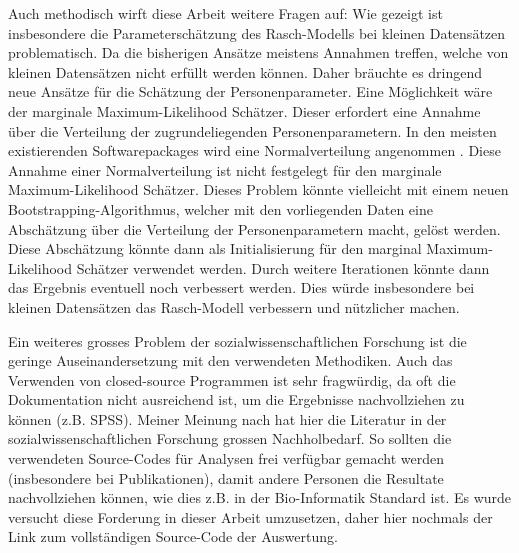 Auch methodisch wirft diese Arbeit weitere Fragen auf: Wie gezeigt ist insbesondere die Parameterschätzung des Rasch-Modells bei kleinen Datensätzen problematisch. Da die bisherigen Ansätze meistens Annahmen treffen, welche von kleinen Datensätzen nicht erfüllt werden können. Daher bräuchte es dringend neue Ansätze für die Schätzung der Personenparameter. Eine Möglichkeit wäre der marginale Maximum-Likelihood Schätzer. Dieser erfordert eine Annahme über die Verteilung der zugrundeliegenden Personenparametern. In den meisten existierenden Softwarepackages wird eine Normalverteilung angenommen \citep{Rost2004, Rizopoulos2006}. Diese Annahme einer Normalverteilung ist nicht festgelegt für den marginale Maximum-Likelihood Schätzer. Dieses Problem könnte vielleicht mit einem neuen Bootstrapping-Algorithmus, welcher mit den vorliegenden Daten eine Abschätzung über die Verteilung der Personenparametern macht, gelöst werden. Diese Abschätzung könnte dann als Initialisierung für den marginal Maximum-Likelihood Schätzer verwendet werden. Durch weitere Iterationen könnte dann das Ergebnis eventuell noch verbessert werden. Dies würde insbesondere bei kleinen Datensätzen das Rasch-Modell verbessern und nützlicher machen.

Ein weiteres grosses Problem der sozialwissenschaftlichen Forschung ist die geringe Auseinandersetzung mit den verwendeten Methodiken. Auch das Verwenden von closed-source Programmen ist sehr fragwürdig, da oft die Dokumentation nicht ausreichend ist, um die Ergebnisse nachvollziehen zu können (z.B. SPSS).  Meiner Meinung nach hat hier die Literatur in der sozialwissenschaftlichen Forschung grossen Nachholbedarf. So sollten die verwendeten Source-Codes für Analysen frei verfügbar gemacht werden (insbesondere bei Publikationen), damit andere Personen die Resultate nachvollziehen können, wie dies z.B. in der Bio-Informatik Standard ist. Es wurde versucht diese Forderung in dieser Arbeit umzusetzen, daher hier nochmals der Link zum vollständigen Source-Code der Auswertung.

